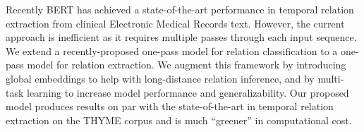 Recently BERT has achieved a state-of-the-art performance in temporal relation extraction from clinical Electronic Medical Records text. However, the current approach is inefficient as it requires multiple passes through each input sequence. We extend a recently-proposed one-pass model for relation classification to a one-pass model for relation extraction. We augment this framework by introducing global embeddings to help with long-distance relation inference, and by multi-task learning to increase model performance and generalizability. Our proposed model produces results on par with the state-of-the-art in temporal relation extraction on the THYME corpus and is much ``greener'' in computational cost.
